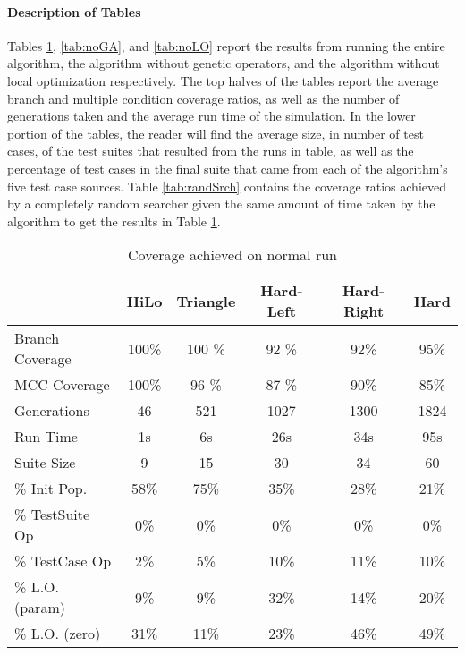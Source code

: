 \documentclass[runningheads]{llncs}
\begin{document}
\paragraph{Description of Tables} Tables \ref{tab:entireAlg}, \ref{tab:noGA}, and \ref{tab:noLO} report the results from running the entire algorithm, the algorithm without genetic operators, and the algorithm without local optimization respectively. The top halves of the tables report the average branch and multiple condition coverage ratios, as well as the number of generations taken and the average run time of the simulation. In the lower portion of the tables, the reader will find the average size, in number of test cases, of the test suites that resulted from the runs in table, as well as the percentage of test cases in the final suite that came from each of the algorithm's five test case sources. Table \ref{tab:randSrch} contains the coverage ratios achieved by a completely random searcher given the same amount of time taken by the algorithm to get the results in Table \ref{tab:entireAlg}.

\begin{table}[h!]
	\begin{center}
		\def\arraystretch{1.2}%
		\setlength\tabcolsep{1em}
		\begin{tabular}{| l | c  c  c  c c |}
			\hline
				             & HiLo  		 & Triangle		& Hard-Left	& 	Hard-Right 		& Hard		\\ \hline
			Branch Coverage	 & 100\%         & 100	\%      & 92 \%      	& 92\%          & 95\%      \\ \hline
			MCC Coverage	 & 100\%         & 96 \%        & 87 \%      	& 90\%          & 85\%      \\ \hline
			Generations		 & 46          	 & 521          & 1027       	& 1300          & 1824      \\ \hline
			Run Time		 & 1s          	 & 6s           & 26s       	& 34s          	& 95s       \\ \hhline{|=|=====|}
			
			Suite Size       & 9        	& 15       	 	& 30			& 34          	& 60        \\ \hline
			\% Init Pop.     & 58\%         & 75\%       	& 35\%       	& 28\%         	& 21\%      \\ \hline
			\% TestSuite Op  & 0\%          & 0\%       	& 0\%			& 0\%          	& 0\%       \\ \hline
			\% TestCase Op   & 2\%          & 5\%       	& 10\%      	& 11\%         	& 10\%      \\ \hline
			\% 	L.O. (param) & 9\%          & 9\%       	& 32\%       	& 14\%          & 20\%      \\ \hline
			\% L.O. (zero)	 & 31\%         & 11\%      	& 23\%       	& 46\%          & 49\%      \\ \hline
		\end{tabular}
	\end{center}
	\caption{Coverage achieved on normal run}  
	\label{tab:entireAlg}
\end{table}
\end{document}
